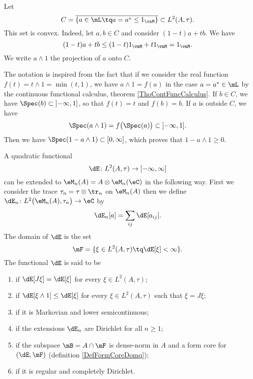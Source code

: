 Let
\begin{equation}
	C=\overline{ \{ a\in\mL\tq a=a^*\leq 1_{\vnM} \} }\subset L^2(A,\tau).
\end{equation}
This set is convex. Indeed, let $a,b\in C$ and consider $(1-t)a+tb$. We have
\begin{equation}
	(1-t)a+tb\leq(1-t)1_{\vnM}+t 1_{\vnM}=1_{\vnM}.
\end{equation}
We write $a\wedge 1$ the projection of $a$ onto $C$.

The notation is inspired from the fact that if we consider the real function $f(t)=t\wedge 1=\min(t,1)$, we have $a\wedge 1=f(a)$ in the case $a=a^*\in\mL$ by the continuous functional calculus, theorem \ref{ThoContFuncCalculus}. If $b\in C$, we have $\Spec(b)\subset\mathopen] -\infty , 1 \mathclose]$, so that $f(t)=t$ and $f(b)=b$. If $a$ is outside $C$, we have
\begin{equation}
	\Spec(a\wedge 1)=f\big( \Spec(a) \big)\subset\mathopen] -\infty , 1 \mathclose].
\end{equation}
Then we have $\Spec(1-a\wedge 1)\subset\mathopen[ 0 , \infty \mathclose]$, which proves that $1-a\wedge 1\geq 0$.

A quadratic functional
\begin{equation}
	\dE\colon L^2(A,\tau)\to \mathopen] -\infty , \infty \mathclose]
\end{equation}
can be extended to $\eM_n(A)=A\otimes\eM_n(\eC)$ in the following way. First we consider the trace $\tau_n=\tau\otimes\tr_n$ on $\eM_n(A)$ then we define $\dE_n\colon L^2\big( \eM_n(A),\tau_n \big)\to \eC$ by
\begin{equation}
	\dE_n[a]=\sum_{ij}\dE[a_{ij}].
\end{equation}
The domain of $\dE$ is the set
\begin{equation}
	\mF=\{ \xi\in L^2(A,\tau)\tq \dE[\xi]<\infty \}.
\end{equation}
The functional $\dE$ is said to be
\begin{enumerate}
	\item
		 if $\dE[J\xi]=\dE[\xi]$ for every $\xi\in L^2(A,\tau)$;
	\item
		 if $\dE[\xi\wedge 1]\leq\dE[\xi]$ for every $\xi\in L^2(A,\tau)$ such that $\xi=J\xi$;
	\item
		 if it is Markovian and lower semicontinuous;
	\item
		 if the extensions $\dE_n$ are Dirichlet for all $n\geq 1$;
	\item
		 if the subspace $\mB=A\cap\mF$ is dense-norm in $A$ and a form core for $(\dE,\mF)$ (definition \ref{DefFormCoreDomq});
	\item
		 if it is regular and completely Dirichlet.
\end{enumerate}

